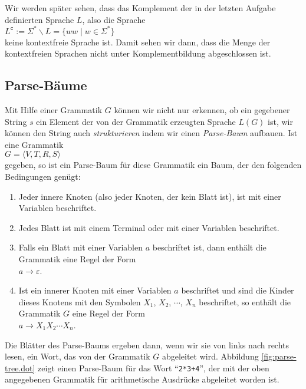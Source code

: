 \remark
Wir werden sp\"ater sehen, dass das Komplement der in der letzten Aufgabe definierten Sprache $L$,
also die Sprache
\\[0.2cm]
\hspace*{1.3cm}
$L^\mathtt{c} := \Sigma^* \backslash L = \bigl\{ ww \mid  w\in\Sigma^* \bigr\}$
\\[0.2cm]
keine kontextfreie Sprache ist.  Damit sehen wir dann, dass die Menge der kontextfreien Sprachen
nicht unter Komplementbildung abgeschlossen ist. \eox

\subsection{Parse-B\"aume}
Mit Hilfe einer Grammatik $G$ k\"onnen wir nicht nur erkennen, ob ein gegebener String $s$ ein
Element der von der Grammatik erzeugten Sprache $L(G)$ ist, wir k\"onnen den String auch
\emph{strukturieren} indem wir einen \emph{Parse-Baum} aufbauen.  Ist eine Grammatik
\\[0.2cm]
\hspace*{1.3cm}
$G = \langle V, T, R, S \rangle$
\\[0.2cm]
gegeben, so ist ein Parse-Baum f\"ur diese Grammatik ein Baum, der den folgenden 
Bedingungen gen\"ugt:
\begin{enumerate}
\item Jeder innere Knoten (also jeder Knoten, der kein Blatt ist),
      ist mit einer Variablen beschriftet.
\item Jedes Blatt ist mit einem Terminal oder mit einer Variablen beschriftet.
\item Falls ein Blatt mit einer Variablen $a$ beschriftet ist, dann enth\"alt die Grammatik eine 
      Regel der Form
      \\[0.2cm]
      \hspace*{1.3cm}
      $a \rightarrow \varepsilon$.
\item Ist ein innerer Knoten mit einer Variablen $a$ beschriftet und sind die Kinder
      dieses Knotens mit den Symbolen $X_1$, $X_2$, $\cdots$, $X_n$ beschriftet, so
      enth\"alt die Grammatik $G$ eine Regel der Form 
      \\[0.2cm]
      \hspace*{1.3cm}
      $a \rightarrow X_1 X_2 \cdots X_n$.
\end{enumerate}
Die Bl\"atter des Parse-Baums ergeben dann, wenn wir sie von links nach rechts lesen, ein Wort,
das von der Grammatik $G$ abgeleitet wird.  Abbildung \ref{fig:parse-tree.dot} zeigt einen
Parse-Baum f\"ur das Wort ``\texttt{2*3+4}'', der mit der oben angegebenen Grammatik f\"ur
arithmetische Ausdr\"ucke abgeleitet worden ist.


